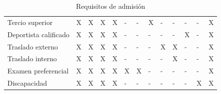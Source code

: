 \begin{table}[ht]
{\begin{tabular}{ p{2cm} m{2cm} m{2cm} m{2cm} m{2cm} m{2cm} m{2cm} m{2cm} m{2cm} m{2cm} m{3cm} m{3cm} m{3cm}}
			Tercio superior & 
			\centering X & 
			\centering X & 
			\centering X & 
			\centering X & 
			\centering - &
			\centering - &
			\centering X &
			\centering - &
			\centering - &
			\centering - &
			\centering - &
			 X \\
			Deportista calificado & 
			\centering X & 
			\centering X & 
			\centering X & 
			\centering X & 
			\centering - &
			\centering - &
			\centering - &
			\centering - &
			\centering - &
			\centering X &
			\centering - &
			 X \\
			Traslado externo & 
			\centering X & 
			\centering X & 
			\centering X & 
			\centering X & 
			\centering - &
			\centering - &
			\centering - &
			\centering X &
			\centering X &
			\centering - &
			\centering - &
			 X \\
			Traslado interno & 
			\centering X & 
			\centering X & 
			\centering X & 
			\centering X & 
			\centering - &
			\centering - &
			\centering - &
			\centering - &
			\centering X &
			\centering - &
			\centering - &
			 X \\
			Examen preferencial & 
			\centering X & 
			\centering X & 
			\centering X & 
			\centering X & 
			\centering X &
			\centering X &
			\centering - &
			\centering - &
			\centering - &
			\centering - &
			\centering - &
			 X \\
			Discapacidad & 
			\centering X & 
			\centering X & 
			\centering X & 
			\centering X & 
			\centering - &
			\centering - &
			\centering - &
			\centering - &
			\centering - &
			\centering - &
			\centering X &
			 X \\												
			
			\hline
			\end{tabular}
			}
		\caption{Requisitos de admisión}
		
	\end{table}


